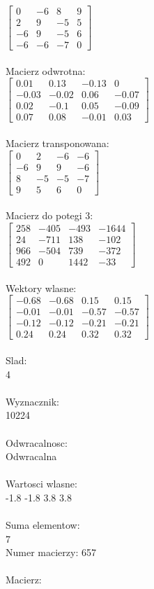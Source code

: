 \documentclass[a4paper,12pt]{article}
\begin{document}
$\begin{bmatrix} 0&-6&8&9\\2&9&-5&5\\-6&9&-5&6\\-6&-6&-7&0 \end{bmatrix}$
\\
\\
Macierz odwrotna:\\

$\begin{bmatrix} 0.01&0.13&-0.13&0\\-0.03&-0.02&0.06&-0.07\\0.02&-0.1&0.05&-0.09\\0.07&0.08&-0.01&0.03 \end{bmatrix}$
\\
\\
Macierz transponowana:\\

$\begin{bmatrix} 0&2&-6&-6\\-6&9&9&-6\\8&-5&-5&-7\\9&5&6&0 \end{bmatrix}$
\\
\\
Macierz do potegi 3:\\

$\begin{bmatrix} 258&-405&-493&-1644\\24&-711&138&-102\\966&-504&739&-372\\492&0&1442&-33 \end{bmatrix}$
\\
\\
Wektory wlasne:\\

$\begin{bmatrix} -0.68&-0.68&0.15&0.15\\-0.01&-0.01&-0.57&-0.57\\-0.12&-0.12&-0.21&-0.21\\0.24&0.24&0.32&0.32 \end{bmatrix}$
\\
\\
Slad:\\
4
\\
\\
Wyznacznik:\\
10224
\\
\\
Odwracalnosc:\\
Odwracalna
\\
\\
Wartosci wlasne:\\
-1.8 -1.8 3.8 3.8
\\
\\
Suma elementow:\\
7
\\
\newpage
Numer macierzy:
657
\\
\\
Macierz:\\
\end{document}
